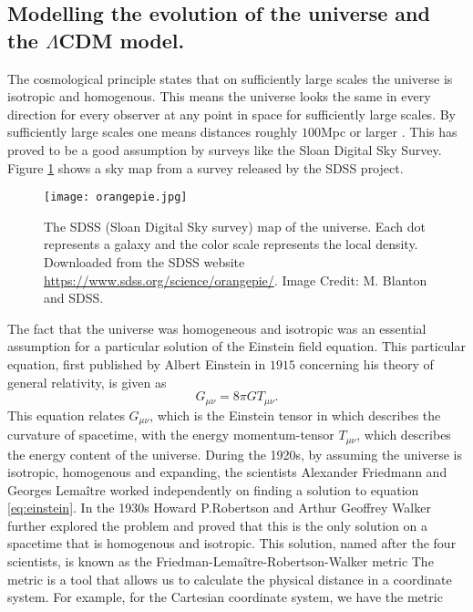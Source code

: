 \subsection{Modelling the evolution of the universe and the $\Lambda$CDM model.}
The cosmological principle states that on sufficiently
large scales the universe is isotropic and homogenous. This means the universe
looks the same in every direction for every observer at any point in space for
sufficiently large scales. By sufficiently large scales one means
distances roughly $100$Mpc or larger \cite[p.~12]{ryden2017introduction}. This has proved to be a good
assumption by surveys like the Sloan Digital Sky Survey\cite{sloanhomogenous}. Figure \ref{fig:sdssmap} shows a sky map from a survey released by the SDSS project.\\
\begin{figure}[htbp]
    \texttt{[image: orangepie.jpg]}
    \caption{The SDSS (Sloan Digital Sky survey) map of the universe. Each dot represents a galaxy and the color scale represents the local density. Downloaded from the SDSS website \url{https://www.sdss.org/science/orangepie/}. Image Credit: M. Blanton and SDSS.}
    \label{fig:sdssmap}
\end{figure}
The fact that the universe was homogeneous and isotropic was an essential assumption
for a particular solution of the Einstein field equation. 
This particular equation, first published by Albert Einstein in $1915$ \cite{Einstein1915} concerning his theory of general relativity, is given as
\begin{equation}\label{eq:einstein}
    G_{\mu\nu}=8\pi GT_{\mu\nu}.
\end{equation}
This equation relates $G_{\mu\nu}$, which is the Einstein tensor in which describes the curvature of spacetime, with the energy momentum-tensor
$T_{\mu\nu}$, which describes the energy content of the universe. During the 1920s, by assuming the universe is isotropic, homogenous and expanding, the scientists Alexander Friedmann and Georges Lemaître worked independently on finding a solution to equation \ref{eq:einstein}. In the 1930s Howard P.Robertson and Arthur Geoffrey Walker further explored the problem and proved that this is the only solution on a spacetime that is homogenous and isotropic.
This solution, named after the four scientists, is known as the Friedman-Lemaître-Robertson-Walker metric
The metric is a tool that allows us to calculate the physical distance in a coordinate system.
For example, for the Cartesian coordinate system, we have the metric 
